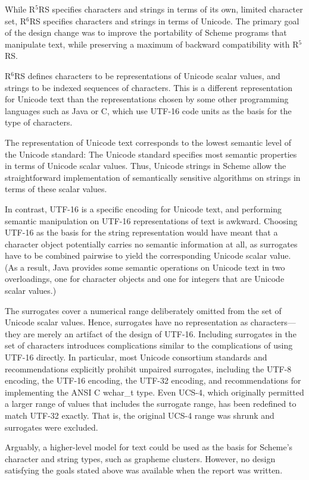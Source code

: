 \documentclass[twoside,twocolumn]{algol60}
\newcommand{\rn}[1]{R$^{#1}$RS}
\begin{document}
While \rn{5} specifies characters and strings in terms of its own,
limited character set, \rn{6} specifies characters and strings in
terms of Unicode.  The primary goal of the design change was to
improve the portability of Scheme programs that manipulate text, while
preserving a maximum of backward compatibility with \rn{5}.

\rn{6} defines characters to be representations of Unicode scalar
values, and strings to be indexed sequences of characters.  This is a
different representation for Unicode text than the representations
chosen by some other programming languages such as Java or
C\sharpsign{}, which use UTF-16 code units as the basis for the type
of characters.

The representation of Unicode text corresponds to the lowest semantic
level of the Unicode standard: The Unicode standard specifies most
semantic properties in terms of Unicode scalar values.  Thus, Unicode
strings in Scheme allow the straightforward implementation of
semantically sensitive algorithms on strings in terms of these scalar
values.

In contrast, UTF-16 is a specific encoding for Unicode text, and
performing semantic manipulation on UTF-16 representations of text is
awkward.  Choosing UTF-16 as the basis for the string representation
would have meant that a character object potentially carries no
semantic information at all, as surrogates have to be combined
pairwise to yield the corresponding Unicode scalar value.  (As a
result, Java provides some semantic operations on Unicode text 
in two overloadings, one for character objects and one for
integers that are Unicode scalar values.)

The surrogates cover a numerical range deliberately omitted from the
set of Unicode scalar values.  Hence, surrogates have no
representation as characters---they are merely an artifact of the
design of UTF-16.  Including surrogates in the set of characters
introduces complications similar to the complications of using UTF-16
directly.  In particular, most Unicode consortium standards and
recommendations explicitly prohibit unpaired surrogates, including the
UTF-8 encoding, the UTF-16 encoding, the UTF-32 encoding, and
recommendations for implementing the ANSI C {\cf wchar\_t} type.  Even
UCS-4, which originally permitted a larger range of values that
includes the surrogate range, has been redefined to match UTF-32
exactly. That is, the original UCS-4 range was shrunk and surrogates
were excluded.

Arguably, a higher-level model for text could be used as the basis for
Scheme's character and string types, such as grapheme clusters.
However, no design satisfying the goals stated above was available
when the report was written.
\end{document}
